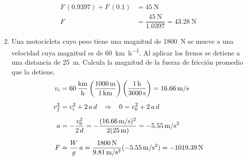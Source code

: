 \documentclass[14pt]{extarticle}
\begin{document}
\begin{enumerate}
\begin{align*}
F \, (0.9397) + F \, (0.1) &= \SI{45}{\newton} \\[0.5em]
F &= \dfrac{\SI{45}{\newton}}{1.0397} = \SI{43.28}{\newton}
\end{align*}
\item Una motocicleta cuyo peso tiene una magnitud de \SI{1800}{\newton} se mueve a una velocidad cuya magnitud es de \SI{60}{\kilo\meter\per\hour}. Al aplicar los frenos se detiene a una distancia de \SI{25}{\meter}. Calcula la magnitud de la fuerza de fricción promedio que la detiene.
\begin{align*}
v_{i} &= \SI[per-mode=fraction]{60}{\kilo\meter\per\hour}\left( \dfrac{\SI{1000}{\meter}}{\SI{1}{\kilo\meter}} \right) \left( \dfrac{\SI{1}{\hour}}{\SI{3600}{\second}} \right) = \SI{16.66}{\meter\per\second} \\[0.5em]
v_{f}^{2} &= v_{i}^{2} + 2 \, a \, d \hspace{0.3cm} \Rightarrow \hspace{0.3cm} 0 = v_{0}^{2} + 2 \, a \, d \\[0.5em]
a &= - \dfrac{v_{0}^{2}}{2 \, d} = - \dfrac{(\SI{16.66}{\meter\per\second})^{2}}{2 (\SI{25}{\meter})} = - \SI{5.55}{\meter\per\square\second} \\[0.5em]
F &= \dfrac{W}{g} \, a = \dfrac{\SI{1800}{\newton}}{\SI{9.81}{\meter\per\square\second}} (- \SI{5.55}{\meter\per\square\second}) = - \SI{1019.39}{\newton}
\end{align*}
\end{enumerate}
\end{document}
